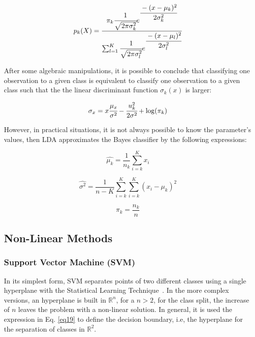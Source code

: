 \begin{equation}
    p_k(X) = \cfrac{\pi_k \cfrac{1}{\sqrt{2\pi\sigma^2_k}}e^{\cfrac{-(x-\mu_k)^2}{2\sigma^2_k}}}{\sum^K_{l=1}\cfrac{1}{\sqrt{2\pi\sigma^2_l}}e^{\cfrac{-(x-\mu_l)^2}{2\sigma^2_l}}} \label{eq8}
\end{equation}

After some algebraic manipulations, it is possible to conclude that classifying one
observation to a given class is equivalent to classify one observation to a given class 
such that the the linear discriminant function $\sigma_k(x)$ is larger:

\begin{equation}
    \sigma_x = x\cfrac{\mu_x}{\sigma^2} - \cfrac{u_k^2}{2\sigma^2} + \log(\pi_k) \label{eq9}
\end{equation}

However, in practical situations, it is not always possible to know the parameter's values,
then LDA approximates the Bayes classifier by the following expressions:

\begin{equation}
    \hat{\mu_k} = \frac{1}{n_k} \sum^K_{i = k} x_i \label{eq10}
\end{equation}

\begin{equation}
    \hat{\sigma^2} = \frac{1}{n-K} \sum^K_{i = k} \sum^K_{i = k} (x_i-\hat{\mu_k})^2 \label{eq11}
\end{equation}

\begin{equation}
    \pi_k = \frac{n_k}{n}\label{eq12}
\end{equation}

\subsection{Non-Linear Methods}

\subsubsection{Support Vector Machine (SVM)}
\label{SVM}
In its simplest form, SVM separates points of two different classes using a single hyperplane with the Statistical Learning Technique~\cite{vapnik95, vapnik98}.
In the more complex versions, an hyperplane is built in $\mathbb{R}^n$, for a $n>2$, for 
the class split, the increase of $n$ leaves the problem with a non-linear solution. In general, it is used the expression in Eq. \eqref{eq19} to define the decision boundary, i.e, the hyperplane
for the separation of classes in $\mathbb{R}^2$.

